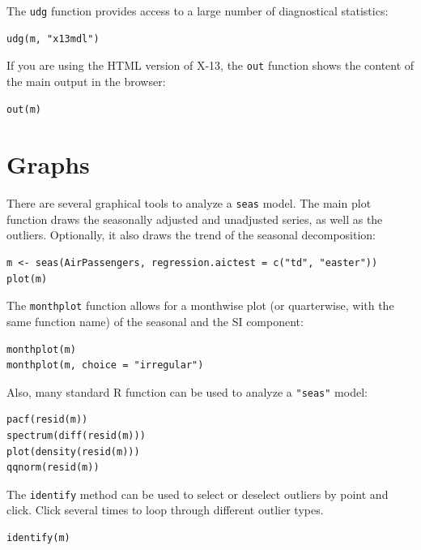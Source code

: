 The \texttt{udg} function provides access to a large number of
diagnostical statistics:

\begin{verbatim}
udg(m, "x13mdl")
\end{verbatim}

If you are using the HTML version of X-13, the \texttt{out} function
shows the content of the main output in the browser:

\begin{verbatim}
out(m)
\end{verbatim}

\section{Graphs}\label{graphs}

There are several graphical tools to analyze a \texttt{seas} model. The
main plot function draws the seasonally adjusted and unadjusted series,
as well as the outliers. Optionally, it also draws the trend of the
seasonal decomposition:

\begin{verbatim}
m <- seas(AirPassengers, regression.aictest = c("td", "easter"))
plot(m)
\end{verbatim}

The \texttt{monthplot} function allows for a monthwise plot (or
quarterwise, with the same function name) of the seasonal and the SI
component:

\begin{verbatim}
monthplot(m)
monthplot(m, choice = "irregular")
\end{verbatim}

Also, many standard R function can be used to analyze a \texttt{"seas"}
model:

\begin{verbatim}
pacf(resid(m))
spectrum(diff(resid(m)))
plot(density(resid(m)))
qqnorm(resid(m))
\end{verbatim}

The \texttt{identify} method can be used to select or deselect outliers
by point and click. Click several times to loop through different
outlier types.

\begin{verbatim}
identify(m)
\end{verbatim}


